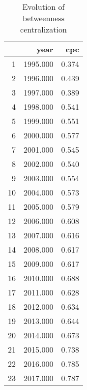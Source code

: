 \begin{table}[ht]
\centering
\begin{tabular}{rrr}
  \hline
 & year & cpc \\ 
  \hline
1 & 1995.000 & 0.374 \\ 
  2 & 1996.000 & 0.439 \\ 
  3 & 1997.000 & 0.389 \\ 
  4 & 1998.000 & 0.541 \\ 
  5 & 1999.000 & 0.551 \\ 
  6 & 2000.000 & 0.577 \\ 
  7 & 2001.000 & 0.545 \\ 
  8 & 2002.000 & 0.540 \\ 
  9 & 2003.000 & 0.554 \\ 
  10 & 2004.000 & 0.573 \\ 
  11 & 2005.000 & 0.579 \\ 
  12 & 2006.000 & 0.608 \\ 
  13 & 2007.000 & 0.616 \\ 
  14 & 2008.000 & 0.617 \\ 
  15 & 2009.000 & 0.617 \\ 
  16 & 2010.000 & 0.688 \\ 
  17 & 2011.000 & 0.628 \\ 
  18 & 2012.000 & 0.634 \\ 
  19 & 2013.000 & 0.644 \\ 
  20 & 2014.000 & 0.673 \\ 
  21 & 2015.000 & 0.738 \\ 
  22 & 2016.000 & 0.785 \\ 
  23 & 2017.000 & 0.787 \\ 
   \hline
\end{tabular}
\caption{Evolution of betweenness centralization} 
\end{table}

